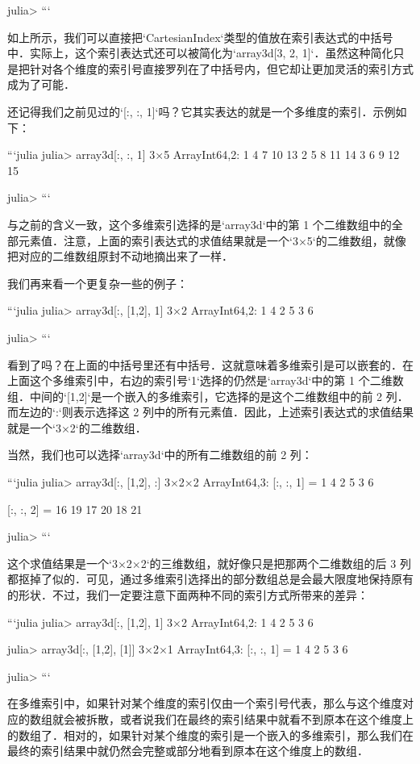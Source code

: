 julia>
```

如上所示，我们可以直接把`CartesianIndex`类型的值放在索引表达式的中括号中．实际上，这个索引表达式还可以被简化为`array3d[3, 2, 1]`．虽然这种简化只是把针对各个维度的索引号直接罗列在了中括号内，但它却让更加灵活的索引方式成为了可能．

还记得我们之前见过的`[:, :, 1]`吗？它其实表达的就是一个多维度的索引．示例如下：

```julia
julia> array3d[:, :, 1]
3×5 Array{Int64,2}:
 1  4  7  10  13
 2  5  8  11  14
 3  6  9  12  15

julia> 
```

与之前的含义一致，这个多维索引选择的是`array3d`中的第 1 个二维数组中的全部元素值．注意，上面的索引表达式的求值结果就是一个`3×5`的二维数组，就像把对应的二维数组原封不动地摘出来了一样．

我们再来看一个更复杂一些的例子：

```julia
julia> array3d[:, [1,2], 1]
3×2 Array{Int64,2}:
 1  4
 2  5
 3  6

julia> 
```

看到了吗？在上面的中括号里还有中括号．这就意味着多维索引是可以嵌套的．在上面这个多维索引中，右边的索引号`1`选择的仍然是`array3d`中的第 1 个二维数组．中间的`[1,2]`是一个嵌入的多维索引，它选择的是这个二维数组中的前 2 列．而左边的`:`则表示选择这 2 列中的所有元素值．因此，上述索引表达式的求值结果就是一个`3×2`的二维数组．

当然，我们也可以选择`array3d`中的所有二维数组的前 2 列：

```julia
julia> array3d[:, [1,2], :]
3×2×2 Array{Int64,3}:
[:, :, 1] =
 1  4
 2  5
 3  6

[:, :, 2] =
 16  19
 17  20
 18  21

julia> 
```

这个求值结果是一个`3×2×2`的三维数组，就好像只是把那两个二维数组的后 3 列都抠掉了似的．可见，通过多维索引选择出的部分数组总是会最大限度地保持原有的形状．不过，我们一定要注意下面两种不同的索引方式所带来的差异：

```julia
julia> array3d[:, [1,2], 1]
3×2 Array{Int64,2}:
 1  4
 2  5
 3  6

julia> array3d[:, [1,2], [1]]
3×2×1 Array{Int64,3}:
[:, :, 1] =
 1  4
 2  5
 3  6

julia> 
```

在多维索引中，如果针对某个维度的索引仅由一个索引号代表，那么与这个维度对应的数组就会被拆散，或者说我们在最终的索引结果中就看不到原本在这个维度上的数组了．相对的，如果针对某个维度的索引是一个嵌入的多维索引，那么我们在最终的索引结果中就仍然会完整或部分地看到原本在这个维度上的数组．

